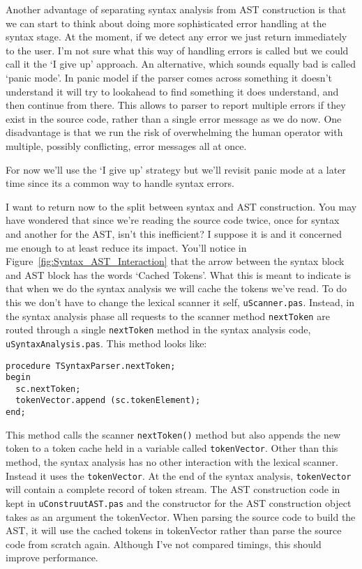 Another advantage of separating syntax analysis from AST construction is that we can start to think about doing more sophisticated error handling at the syntax stage. At the moment, if we detect any error we just return immediately to the user. I'm not sure what this way of handling errors is called but we could call it the `I give up' approach. An alternative, which sounds equally bad is called `panic mode'. In panic model if the parser comes across something it doesn't understand it will try to lookahead to find something it does understand, and then continue from there. This allows to parser to report multiple errors if they exist in the source code, rather than a single error message as we do now. One disadvantage is that we run the risk of overwhelming the human operator with multiple, possibly conflicting, error messages all at once.

For now we'll use the `I give up' strategy but we'll revisit panic mode at a later time since its a common way to handle syntax errors.

I want to return now to the split between syntax and AST construction. You may have wondered that since we're reading the source code twice, once for syntax and another for the AST, isn't this inefficient? I suppose it is and it concerned me enough to at least reduce its impact. You'll notice in Figure~\ref{fig:Syntax_AST_Interaction} that the arrow between the syntax block and AST block has the words `Cached Tokens'. What this is meant to indicate is that when we do the syntax analysis we will cache the tokens we've read. To do this we don't have to change the lexical scanner it self, {\tt uScanner.pas}. Instead, in the syntax analysis phase all requests to the scanner method {\tt nextToken} are routed through a single {\tt nextToken} method in the syntax analysis code, {\tt uSyntaxAnalysis.pas}. This method looks like:

\begin{lstlisting}
procedure TSyntaxParser.nextToken;
begin
  sc.nextToken;
  tokenVector.append (sc.tokenElement);
end;
\end{lstlisting}

This method calls the scanner {\tt nextToken()} method but also appends the new token to a token cache held in a variable called {\tt tokenVector}. Other than this method, the syntax analysis has no other interaction with the lexical scanner. Instead it uses the {\tt tokenVector}. At the end of the syntax analysis, {\tt tokenVector} will contain a complete record of token stream. The AST construction code in kept in {\tt uConstruutAST.pas} and the constructor for the AST construction object takes as an argument the tokenVector. When parsing the source code to build the AST, it will use the cached tokens in tokenVector rather than parse the source code from scratch again. Although I've not compared timings, this should improve performance.

